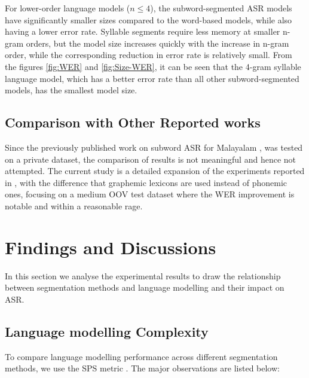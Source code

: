 For lower-order language models ($n\le4$), the subword-segmented ASR models
have significantly smaller sizes compared to the word-based models, while also
having a lower error rate. Syllable segments require less memory at smaller
n-gram orders, but the model size increases quickly with the increase in n-gram
order, while the corresponding reduction in error rate is relatively small.
From the figures \ref{fig:WER} and \ref{fig:Size-WER}, it can be seen that the
4-gram syllable language model, which has a better error rate than all other
subword-segmented models, has the smallest model size. \vspace{-0.4cm}
\subsection{Comparison with Other Reported works}

Since the previously published work on subword ASR for Malayalam
\cite{sreeja-hybrid-2022}, was tested on a private dataset, the comparison of
results is not meaningful and hence not attempted. The current study is a
detailed expansion of the experiments reported in \cite{mlphon2022kavya}, with the difference that graphemic lexicons are used instead of phonemic ones, focusing on a medium OOV test
dataset where the WER improvement is notable and within a reasonable rage.

\section{Findings and Discussions}
\label{sec:Ch-openvocab-analysis}

In this section we analyse the experimental results to draw the relationship
between segmentation methods and language modelling and their impact on ASR.

\subsection{Language modelling Complexity }

To compare language modelling performance across different segmentation
methods, we use the SPS metric \cite{Mie2016Can}. The major observations are listed below:

